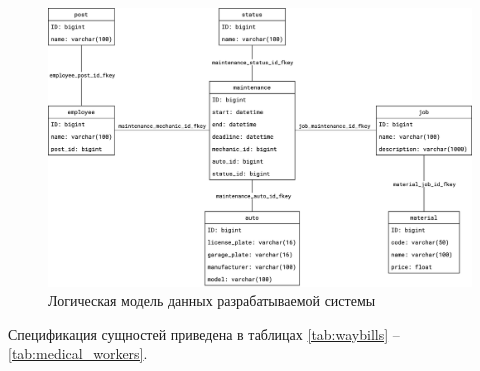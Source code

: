 \documentclass[../nirs.tex]{subfiles}
\begin{document}
\begin{figure}[H]
	\centering
	\includegraphics[keepaspectratio,width=\textwidth]{./images/3_1_db_physical.png}
	\caption{Логическая модель данных разрабатываемой системы}
	\label{fig:3_1_db_physical}
\end{figure}

Спецификация сущностей приведена в таблицах \ref{tab:waybills} --
\ref{tab:medical_workers}.


















\end{document}
